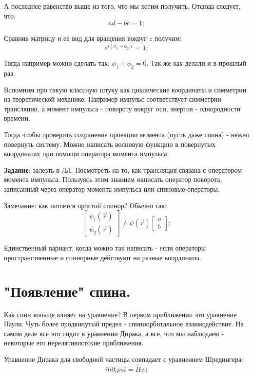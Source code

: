 \documentclass[a4paper, 14pt, russian]{article}
\newcommand{\be}{\begin{equation}}
\newcommand{\ee}{\end{equation}}
\newcommand{\pa}{\partial}
\begin{document}
	А последнее равенство выще из того, что мы хотим получить. 
	Отсюда следует, что:
	\be
		ad - bc = 1;
	\ee

	Сравнив матрицу и ее вид для вращения вокруг $z$ получим:
	\be
		e^{i(\phi_1 + \phi_2)}  =1;
	\ee

	Тогда например можно сделать так: $\phi_1 + \phi_2 = 0$.
	Так же как делали и в прошлый раз. 

	Вспомним про такую классную штуку как циклические координаты 
	и симметрии из теоретической механике. 
	Например импульс соответствует симметрии трансляции,
	а момент импульса - повороту вокруг оси, энергия - однородности времени.

	Тогда чтобы проверить сохранение проекции момента (пусть даже спина) - 
	нежно повернуть систему. Можно написать волновую функцию в повернутых 
	координатах при помощи оператора момента импульса.

	\begin{tcolorbox}
		\textbf{Задание}: залезть в ЛЛ. Посмотреть на то, как трансляция связана с 
		оператором момента импульса. Пользуясь этим знанием написать оператор 
		поворота, записанный через оператор момента импульса или спиновые операторы.
	\end{tcolorbox}

	Замечание: как пишется простой спинор? Обычно так:
	\be
		\begin{bmatrix} \psi_1(\vec r) \\ \psi_2(\vec r) \end{bmatrix}
			\neq \psi(\vec r) \begin{bmatrix} a \\ b \end{bmatrix};
	\ee

	Единственный вариант, когда можно так написать - если операторы пространственные 
	и спинорные действуют на разные координаты.

	\section{"Появление" спина.}

	Как спин вооьще влияет на уравнение? В первом приближении это уравнение Паули.
	Чуть более продвинутый предел - спиниорбитальное взаимодействие. На самом деле
	все это сидит в уравнении Дирака, а все, что мы наблюдаем - некоторые его
	нерелятивистские приближения.

	Уравнение Дирака для свободной частицы совпадает с уравнением Шредингера:
	\be
		i\hbar \pa_t psi = \hat{H} \psi;
	\ee
\end{document}
